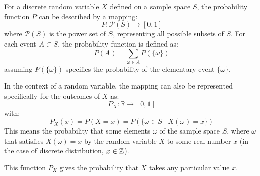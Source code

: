 \begin{definition}
    For a discrete random variable \( X \) defined on a sample space \( S \), the probability function \( P \) can be described by a mapping:
    \[
    P: \mathcal{P}(S) \to [0, 1]
    \]
    where \( \mathcal{P}(S) \) is the power set of \( S \), representing all possible subsets of \( S \). For each event \( A \subset S \), the probability function is defined as:
    \[
    P(A) = \sum_{\omega \in A} P(\{\omega\})
    \]
    assuming \( P(\{\omega\}) \) specifies the probability of the elementary event \( \{\omega\} \).
    
    In the context of a random variable, the mapping can also be represented specifically for the outcomes of \( X \) as:
    \[
    P_X: \mathbb{R} \to [0, 1]
    \]
    with:
    \[
    P_X(x) = P(X = x) = P(\{\omega \in S \mid X(\omega) = x\})
    \]
    This means the probability that some elements $\omega$ of the sample space $S$, where $\omega$ that satisfies $X(\omega)=x$ by the random variable $X$ to some real number $x$ (in the case of discrete distribution, $x\in \mathbb{Z}$).
    
    This function \( P_X \) gives the probability that \( X \) takes any particular value \( x \).    
\end{definition}

